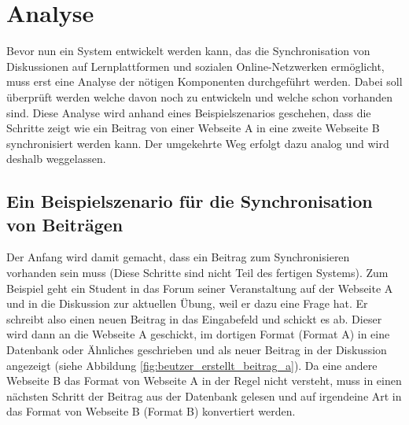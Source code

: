 
\chapter{Analyse} %
\label{cha:analyse}


Bevor nun ein System entwickelt werden kann, das die Synchronisation von Diskussionen auf Lernplattformen und sozialen Online-Netzwerken ermöglicht, muss erst eine Analyse der nötigen Komponenten durchgeführt werden. Dabei soll überprüft werden welche davon noch zu entwickeln und welche schon vorhanden sind. Diese Analyse wird anhand eines Beispielszenarios geschehen, dass die Schritte zeigt wie ein Beitrag von einer Webseite A in eine zweite Webseite B synchronisiert werden kann. Der umgekehrte Weg erfolgt dazu analog und wird deshalb weggelassen.

\section{Ein Beispielszenario für die Synchronisation von Beiträgen} %
\label{sec:analyse_beispiel}

Der Anfang wird damit gemacht, dass ein Beitrag zum Synchronisieren vorhanden sein muss (Diese Schritte sind nicht Teil des fertigen Systems). Zum Beispiel geht ein Student in das Forum seiner Veranstaltung auf der Webseite A und in die Diskussion zur aktuellen Übung, weil er dazu eine Frage hat. Er schreibt also einen neuen Beitrag in das Eingabefeld und schickt es ab. Dieser wird dann an die Webseite A geschickt, im dortigen Format (Format A) in eine Datenbank oder Ähnliches geschrieben und als neuer Beitrag in der Diskussion angezeigt (siehe Abbildung \ref{fig:beutzer_erstellt_beitrag_a}). Da eine andere Webseite B das Format von Webseite A in der Regel nicht versteht, muss in einen nächsten Schritt der Beitrag aus der Datenbank gelesen und auf irgendeine Art in das Format von Webseite B (Format B) konvertiert werden. 

